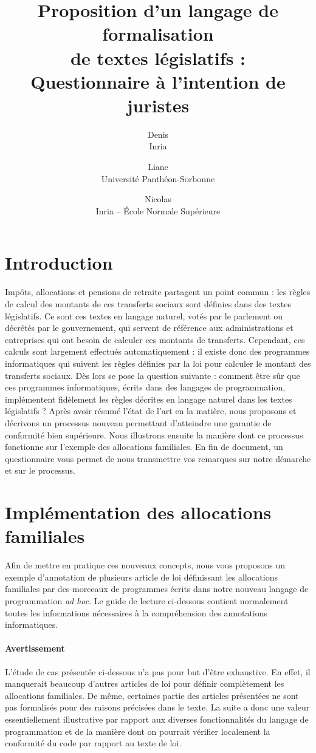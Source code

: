 \documentclass[11pt, french, a4paper]{article}
\title{
  Proposition d'un langage de formalisation\\
  de textes législatifs :\\
  Questionnaire à l'intention de juristes
}
\author{
  Denis \bsc{Merigoux}\\Inria\and
  Liane \bsc{Huttner}\\Université Panthéon-Sorbonne\and
  Nicolas \bsc{Chataing}\\Inria -- École Normale Supérieure\and
}
\begin{document}
\maketitle
\renewcommand{\contentsname}{Sommaire}
\tableofcontents

\section{Introduction}

Impôts, allocations et pensions de retraite partagent un point commun : les règles de calcul des montants de ces transferts sociaux sont définies dans des textes législatifs. Ce sont ces textes en langage naturel, votés par le parlement ou décrétés par le gouvernement, qui servent de référence aux administrations et entreprises qui ont besoin de calculer ces montants de transferts. Cependant, ces calculs sont largement effectués automatiquement : il existe donc des programmes informatiques qui suivent les règles définies par la loi pour calculer le montant des transferts sociaux. Dès lors se pose la question suivante : comment être sûr que ces programmes informatiques, écrits dans des langages de programmation, implémentent fidèlement les règles décrites en langage naturel dans les textes législatifs ? Après avoir résumé l'état de l'art en la matière, nous proposons et décrivons un processus nouveau permettant d'atteindre une garantie de conformité bien supérieure. Nous illustrons ensuite la manière dont ce processus fonctionne sur l'exemple des allocations familiales. En fin de document, un questionnaire vous permet de nous transmettre vos remarques sur notre démarche et sur le processus.



\section{Implémentation des allocations familiales}

Afin de mettre en pratique ces nouveaux concepts, nous vous proposons un exemple d'annotation de plusieurs article de loi  définissant les allocations familiales par des morceaux de programmes écrits dans notre nouveau langage de programmation \emph{ad hoc}. Le guide de lecture ci-dessous contient normalement toutes les informations nécessaires à la compréhension des annotations informatiques.

\paragraph{Avertissement} L'étude de cas présentée ci-dessous n'a pas pour but d'être exhaustive. En effet, il manquerait beaucoup d'autres articles de loi pour définir complètement les allocations familiales. De même, certaines partie des articles présentées ne sont pas formalisés pour des raisons précisées dans le texte. La suite a donc une valeur essentiellement illustrative par rapport aux diverses fonctionnalités du langage de programmation et de la manière dont on pourrait vérifier localement la conformité du code par rapport au texte de loi.
\end{document}
